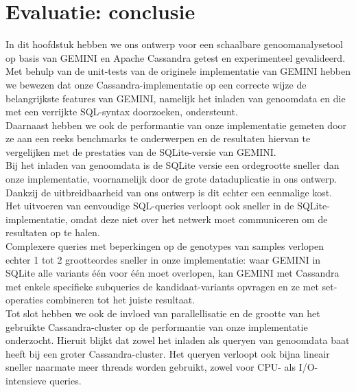 \section{Evaluatie: conclusie}

In dit hoofdstuk hebben we ons ontwerp voor een schaalbare genoomanalysetool op basis van GEMINI en Apache Cassandra getest en experimenteel gevalideerd.\\
Met behulp van de unit-tests van de originele implementatie van GEMINI hebben we bewezen dat onze Cassandra-implementatie op een correcte wijze de belangrijkste features van GEMINI, namelijk het inladen van genoomdata en die met een verrijkte SQL-syntax doorzoeken, ondersteunt.\\
Daarnaast hebben we ook de performantie van onze implementatie gemeten door ze aan een reeks benchmarks te onderwerpen en de resultaten hiervan te vergelijken met de prestaties van de SQLite-versie van GEMINI. \\
Bij het inladen van genoomdata is de SQLite versie een ordegrootte sneller dan onze implementatie, voornamelijk door de grote dataduplicatie in ons ontwerp. Dankzij de uitbreidbaarheid van ons ontwerp is dit echter een eenmalige kost.\\
Het uitvoeren van eenvoudige SQL-queries verloopt ook sneller in de SQLite-implementatie, omdat deze niet over het netwerk moet communiceren om de resultaten op te halen.\\
Complexere queries met beperkingen op de genotypes van samples verlopen echter 1 tot 2 grootteordes sneller in onze implementatie: waar GEMINI in SQLite alle variants \'e\'en voor \'e\'en moet overlopen, kan GEMINI met Cassandra met enkele specifieke subqueries de kandidaat-variants opvragen en ze met set-operaties combineren tot het juiste resultaat.\\
Tot slot hebben we ook de invloed van parallellisatie en de grootte van het gebruikte Cassandra-cluster op de performantie van onze implementatie onderzocht. Hieruit blijkt dat zowel het inladen als queryen van genoomdata baat heeft bij een groter Cassandra-cluster. Het queryen verloopt ook bijna lineair sneller naarmate meer threads worden gebruikt, zowel voor CPU- als I/O-intensieve queries.


